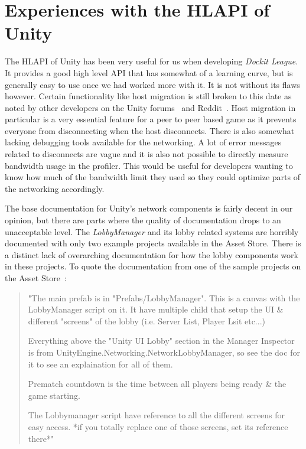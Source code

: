\section{Experiences with the HLAPI of Unity}
The HLAPI of Unity has been very useful for us when developing \emph{Dockit League}. It provides a good high level API that has somewhat of a learning curve, but is generally easy to use once we had worked more with it. It is not without its flaws however. Certain functionality like host migration is still broken to this date as noted by other developers on the Unity forums~\cite{forumsUnityNetworkFeedback} and Reddit~\cite{redditUnityNetwork}. Host migration in particular is a very essential feature for a peer to peer based game as it prevents everyone from disconnecting when the host disconnects. There is also somewhat lacking debugging tools available for the networking. A lot of error messages related to disconnects are vague and it is also not possible to directly measure bandwidth usage in the profiler. This would be useful for developers wanting to know how much of the bandwidth limit they used so they could optimize parts of the networking accordingly. 

The base documentation for Unity's network components is fairly decent in our opinion, but there are parts where the quality of documentation drops to an unacceptable level. The \emph{LobbyManager} and its lobby related systems are horribly documented with only two example projects available in the Asset Store. There is a distinct lack of overarching documentation for how the lobby components work in these projects. To quote the documentation from one of the sample projects on the Asset Store~\cite{unityAssetLobby}: 

\begin{quote}
"The main prefab is in "Prefabs/LobbyManager". This is a canvas with the LobbyManager script on it.
It have multiple child that setup the UI \& different "screens" of the lobby (i.e. Server List, Player Lsit etc...)

Everything above the "Unity UI Lobby" section in the Manager Inspector is from UnityEngine.Networking.NetworkLobbyManager, so see the doc
for it to see an explaination for all of them.

Prematch countdown is the time between all players being ready \& the game starting.

The Lobbymanager script have reference to all the different screens for easy access.
*if you totally replace one of those screens, set its reference there*"
\end{quote}

